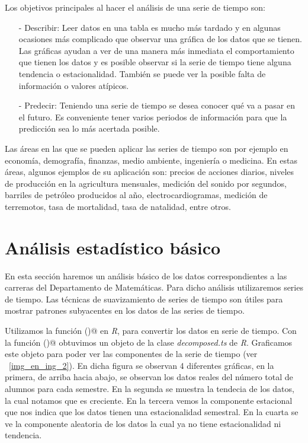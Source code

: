 Los objetivos principales al hacer el análisis de una serie de tiempo son:
  
  \begin{itemize}
\item[-] Describir: Leer datos en una tabla es mucho más tardado y en algunas ocasiones más complicado que observar una gráfica de los datos que se tienen. Las gráficas ayudan a ver de una manera más inmediata el comportamiento que tienen los datos y es posible observar si la serie de tiempo tiene alguna tendencia o estacionalidad. También se puede ver la posible falta de información o valores atípicos.

\item[-] Predecir: Teniendo una serie de tiempo se desea conocer qué va a pasar en el futuro. Es conveniente tener varios periodos de información para que la predicción sea lo más acertada posible.
\end{itemize}

Las áreas en las que se pueden aplicar las series de tiempo son por ejemplo en economía, demografía, finanzas, medio ambiente, ingeniería o medicina. En estas áreas, algunos ejemplos de su aplicación son: precios de acciones diarios, niveles de producción en la agricultura mensuales, medición del sonido por segundos, barriles de petróleo producidos al año, electrocardiogramas, medición de terremotos, tasa de mortalidad, tasa de natalidad, entre otros.


\section{Análisis estadístico básico}

En esta sección haremos un análisis básico de los datos correspondientes a las carreras del Departamento de Matemáticas. Para dicho análisis utilizaremos series de tiempo. Las técnicas de suavizamiento de series de tiempo son útiles para mostrar patrones subyacentes en los datos de las series de tiempo.

Utilizamos la función \verb@ts()@ en \textit{R}, para convertir los datos en serie de tiempo. Con la función \verb@decompose()@ obtuvimos un objeto de la clase \textit{decomposed.ts} de \textit{R}. Graficamos este objeto para poder ver las componentes de la serie de tiempo (ver \figurename{~\ref{img_en_ing_2}}). En dicha figura se observan 4 diferentes gráficas, en la primera, de arriba hacia abajo, se observan los datos reales del número total de alumnos para cada semestre. En la segunda se muestra la tendecia de los datos, la cual notamos que es creciente. En la tercera vemos la componente estacional que nos indica que los datos tienen una estacionalidad semestral. En la cuarta se ve la componente aleatoria de los datos la cual ya no tiene estacionalidad ni tendencia.

